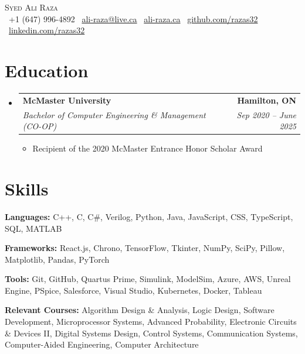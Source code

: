\documentclass[letterpaper,10pt]{article}
\makeatletter
\newcommand{\resumeItem}[1]{
  \item\small{#1 \vspace{-1pt}}
}
\newcommand{\resumeSubheading}[4]{
  \vspace{-1pt}\item
    \begin{tabular*}{0.97\textwidth}[t]{l@{\extracolsep{\fill}}r}
      \textbf{#1} & \textbf{\small #2} \\
      \textit{\small#3} & \textit{\small #4} \\
    \end{tabular*}\vspace{-6pt}
}
\newcommand{\resumeSubHeadingListStart}{\begin{itemize}[leftmargin=0.15in, label={}]}
\newcommand{\resumeSubHeadingListEnd}{\end{itemize}\vspace{-4pt}}
\newcommand{\resumeItemListStart}{\begin{itemize}[leftmargin=0.2in, itemsep=-1pt, topsep=2pt]}
\newcommand{\resumeItemListEnd}{\end{itemize}\vspace{-4pt}}
\makeatother
\begin{document}
\begin{center}
    {\Huge \scshape Syed Ali Raza} \\ \vspace{3pt}
    \small
    \faPhone\ +1 (647) 996-4892 \enspace
    \faEnvelope\ \href{mailto:ali-raza@live.ca}{ali-raza@live.ca} \enspace
    \faGlobe\ \href{https://ali-raza.ca}{ali-raza.ca} \enspace
    \faGithub\ \href{https://github.com/razas32}{github.com/razas32} \enspace
    \faLinkedin\ \href{https://linkedin.com/in/razas32}{linkedin.com/razas32}
\end{center}
\vspace{-6pt}

\section{Education}
  \resumeSubHeadingListStart
    \resumeSubheading
      {McMaster University}{Hamilton, ON}
      {Bachelor of Computer Engineering \& Management (CO-OP)}{Sep 2020 -- June 2025}
      \resumeItemListStart
        \resumeItem{Recipient of the 2020 McMaster Entrance Honor Scholar Award}
      \resumeItemListEnd
  \resumeSubHeadingListEnd

\section{Skills}
\vspace{2pt}
\begin{itemize}[leftmargin=0.15in, label={}, itemsep=0pt, topsep=0pt]
    \small{
      \item \textbf{Languages:} C++, C, C\#, Verilog, Python, Java, JavaScript, CSS, TypeScript, SQL, MATLAB
      \item \textbf{Frameworks:} React.js, Chrono, TensorFlow, Tkinter, NumPy, SciPy, Pillow, Matplotlib, Pandas, PyTorch
      \item \textbf{Tools:} Git, GitHub, Quartus Prime, Simulink, ModelSim, Azure, AWS, Unreal Engine, PSpice, Salesforce, Visual Studio, Kubernetes, Docker, Tableau
      \item \textbf{Relevant Courses:} Algorithm Design \& Analysis, Logic Design, Software Development, Microprocessor Systems, Advanced Probability, Electronic Circuits \& Devices II, Digital Systems Design, Control Systems, Communication Systems, Computer-Aided Engineering, Computer Architecture
    }
\end{itemize}
\vspace{-4pt}
\end{document}
